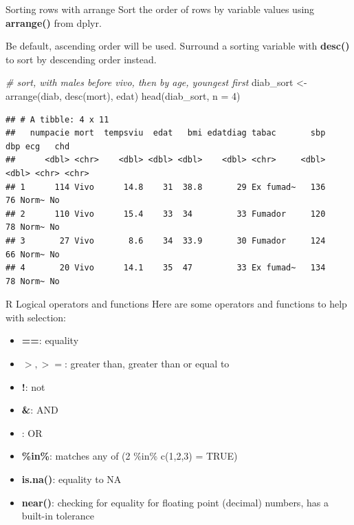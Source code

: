 \documentclass[
  ignorenonframetext,
]{beamer}
\newenvironment{Shaded}{\begin{snugshade}}{\end{snugshade}}
\newcommand{\AttributeTok}[1]{\textcolor[rgb]{0.77,0.63,0.00}{#1}}
\newcommand{\CommentTok}[1]{\textcolor[rgb]{0.56,0.35,0.01}{\textit{#1}}}
\newcommand{\DecValTok}[1]{\textcolor[rgb]{0.00,0.00,0.81}{#1}}
\newcommand{\FunctionTok}[1]{\textcolor[rgb]{0.00,0.00,0.00}{#1}}
\newcommand{\NormalTok}[1]{#1}
\newcommand{\OtherTok}[1]{\textcolor[rgb]{0.56,0.35,0.01}{#1}}
\providecommand{\tightlist}{%
  \setlength{\itemsep}{0pt}\setlength{\parskip}{0pt}}
\begin{document}
\begin{frame}[fragile]{Sorting rows with arrange}
\protect\hypertarget{sorting-rows-with-arrange}{}
Sort the order of rows by variable values using \textbf{arrange()} from
dplyr.

Be default, ascending order will be used. Surround a sorting variable
with \textbf{desc()} to sort by descending order instead.

\footnotesize

\begin{Shaded}
\begin{Highlighting}[]
\CommentTok{\# sort, with males before \textquotesingle{}vivo\textquotesingle{}, then by age, youngest first}
\NormalTok{diab\_sort }\OtherTok{\textless{}{-}} \FunctionTok{arrange}\NormalTok{(diab, }\FunctionTok{desc}\NormalTok{(mort), edat) }
\FunctionTok{head}\NormalTok{(diab\_sort, }\AttributeTok{n =} \DecValTok{4}\NormalTok{)}
\end{Highlighting}
\end{Shaded}

\begin{verbatim}
## # A tibble: 4 x 11
##   numpacie mort  tempsviu  edat   bmi edatdiag tabac       sbp   dbp ecg   chd  
##      <dbl> <chr>    <dbl> <dbl> <dbl>    <dbl> <chr>     <dbl> <dbl> <chr> <chr>
## 1      114 Vivo      14.8    31  38.8       29 Ex fumad~   136    76 Norm~ No   
## 2      110 Vivo      15.4    33  34         33 Fumador     120    78 Norm~ No   
## 3       27 Vivo       8.6    34  33.9       30 Fumador     124    66 Norm~ No   
## 4       20 Vivo      14.1    35  47         33 Ex fumad~   134    78 Norm~ No
\end{verbatim}

\normalsize
\end{frame}

\begin{frame}{R Logical operators and functions}
\protect\hypertarget{r-logical-operators-and-functions}{}
Here are some operators and functions to help with selection:

\begin{itemize}
\tightlist
\item
  \textbf{==}: equality
\item
  \textbf{\(>, >=\)}: greater than, greater than or equal to
\item
  \textbf{!}: not
\item
  \textbf{\&}: AND
\item
  \textbf{\textbar{}}: OR
\item
  \textbf{\%in\%}: matches any of (2 \%in\% c(1,2,3) = TRUE)
\item
  \textbf{is.na()}: equality to NA
\item
  \textbf{near()}: checking for equality for floating point (decimal)
  numbers, has a built-in tolerance
\end{itemize}
\end{frame}
\end{document}

